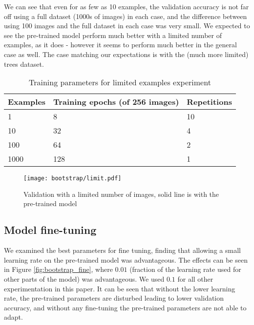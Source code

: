 We can see that even for as few as 10 examples, the validation accuracy is not far off using a full dataset (1000s of images) in each case, and the difference between using 100 images and the full dataset in each case was very small. We expected to see the pre-trained model perform much better with a limited number of examples, as it does - however it seems to perform much better in the general case as well. The case matching our expectations is with the (much more limited) trees dataset.


\begin{table}[ht]
  \centering
    \caption{Training parameters for limited examples experiment}

  \begin{tabular}{ l  l  l}
    Examples & Training epochs (of 256 images) & Repetitions \\
    \toprule
    1 	  & 8 	& 10 \\
    10 	  & 32 	& 4  \\
    100   & 64 	& 2 \\
    1000  & 128 & 1 \\
    \bottomrule
  \end{tabular}
\label{fig:bootstrap_limit_params}
\end{table}



\begin{figure}[ht]
\centering
\texttt{[image: bootstrap/limit.pdf]}
\caption{Validation with a limited number of images, solid line is with the pre-trained model}  
\label{fig:bootstrap_limited}
\end{figure}



\subsection{Model fine-tuning}

We examined the best parameters for fine tuning, finding that allowing a small learning rate on the pre-trained model was advantageous. The effects can be seen in Figure \ref{fig:bootstrap_fine}, where $0.01$ (fraction of the learning rate used for other parts of the model) was advantageous. We used $ 0.1 $ for all other experimentation in this paper. It can be seen that without the lower learning rate, the pre-trained parameters are disturbed leading to lower validation accuracy, and without any fine-tuning the pre-trained parameters are not able to adapt.

